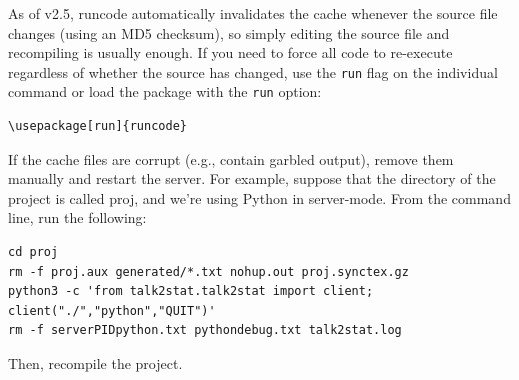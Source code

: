 \documentclass[a4paper,10pt]{article}
\begin{document}
As of v2.5, runcode automatically invalidates the cache whenever the source file changes (using an MD5 checksum), so simply editing the source file and recompiling is usually enough. If you need to force all code to re-execute regardless of whether the source has changed, use the \verb|run| flag on the individual command or load the package with the \verb|run| option:
\begin{Verbatim}
\usepackage[run]{runcode}
\end{Verbatim}
If the cache files are corrupt (e.g., contain garbled output), remove them manually and restart the server. For example, suppose that the directory of the project is called proj, and we're using Python in server-mode. From the command line, run the following:
\begin{Verbatim}
cd proj
rm -f proj.aux generated/*.txt nohup.out proj.synctex.gz
python3 -c 'from talk2stat.talk2stat import client; client("./","python","QUIT")'
rm -f serverPIDpython.txt pythondebug.txt talk2stat.log
\end{Verbatim}
Then, recompile the project.\\
\egroup
\end{document}

